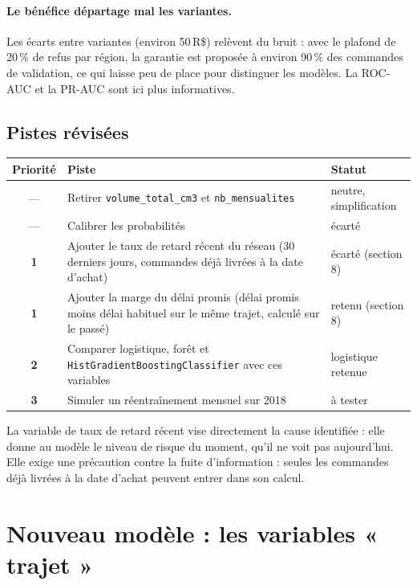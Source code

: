 \documentclass[11pt,a4paper]{article}
\newcommand{\RS}{\,R\$}
\newcommand{\var}[1]{\texttt{#1}}
\begin{document}
\paragraph{Le bénéfice départage mal les variantes.} Les écarts entre variantes (environ
50\RS{}) relèvent du bruit : avec le plafond de 20\,\% de refus par région, la garantie est
proposée à environ 90\,\% des commandes de validation, ce qui laisse peu de place pour
distinguer les modèles. La ROC-AUC et la PR-AUC sont ici plus informatives.

\subsection{Pistes révisées}

\begin{center}
\begin{tabularx}{\linewidth}{@{}c X l@{}}
\toprule
Priorité & Piste & Statut \\
\midrule
--- & Retirer \var{volume\_total\_cm3} et \var{nb\_mensualites} & neutre, simplification \\
--- & Calibrer les probabilités & écarté \\
\textcolor{sinistre}{\textbf{1}} & Ajouter le taux de retard récent du réseau (30 derniers jours, commandes déjà livrées à la date d'achat) & écarté (section 8) \\
\textcolor{sinistre}{\textbf{1}} & Ajouter la marge du délai promis (délai promis moins délai habituel sur le même trajet, calculé sur le passé) & retenu (section 8) \\
\textcolor{prudence}{\textbf{2}} & Comparer logistique, forêt et \var{HistGradientBoostingClassifier} avec ces variables & logistique retenue \\
\textcolor{correct}{\textbf{3}} & Simuler un réentraînement mensuel sur 2018 & à tester \\
\bottomrule
\end{tabularx}
\end{center}

La variable de taux de retard récent vise directement la cause identifiée : elle donne au
modèle le niveau de risque du moment, qu'il ne voit pas aujourd'hui. Elle exige une précaution
contre la fuite d'information : seules les commandes déjà livrées à la date d'achat peuvent
entrer dans son calcul.

\section{Nouveau modèle : les variables « trajet »}
\end{document}
